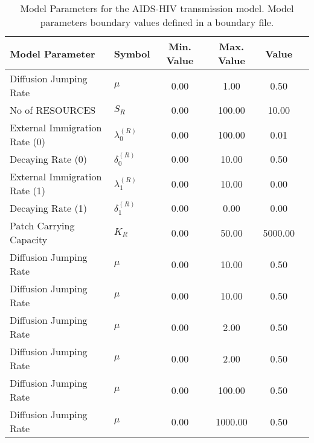 \begin{table}
\centering
\begin{tabular}{p{5cm}lcccc}
{\bf Model Parameter} & {\bf Symbol} & {\bf Min. Value} & {\bf Max. Value} & {\bf Value}\\
\hline\hline
Diffusion Jumping Rate & $\mu$ & 0.00 & 1.00 & 0.50\\
No of RESOURCES & $S_R$ & 0.00 & 100.00 & 10.00\\
External Immigration Rate (0) & $\lambda^{(R)}_0$ & 0.00 & 100.00 & 0.01\\
Decaying Rate (0) & $\delta^{(R)}_0$ & 0.00 & 10.00 & 0.50\\
External Immigration Rate (1) & $\lambda^{(R)}_1$ & 0.00 & 10.00 & 0.00\\
Decaying Rate (1) & $\delta^{(R)}_1$ & 0.00 & 0.00 & 0.00\\
Patch Carrying Capacity & $K_R$ & 0.00 & 50.00 & 5000.00\\
Diffusion Jumping Rate & $\mu$ & 0.00 & 10.00 & 0.50\\
Diffusion Jumping Rate & $\mu$ & 0.00 & 10.00 & 0.50\\
Diffusion Jumping Rate & $\mu$ & 0.00 & 2.00 & 0.50\\
Diffusion Jumping Rate & $\mu$ & 0.00 & 2.00 & 0.50\\
Diffusion Jumping Rate & $\mu$ & 0.00 & 100.00 & 0.50\\
Diffusion Jumping Rate & $\mu$ & 0.00 & 1000.00 & 0.50\\
\hline\hline
\end{tabular}
\caption{Model Parameters for the AIDS-HIV transmission model. Model parameters boundary values defined in a boundary file.}
\end{table}
